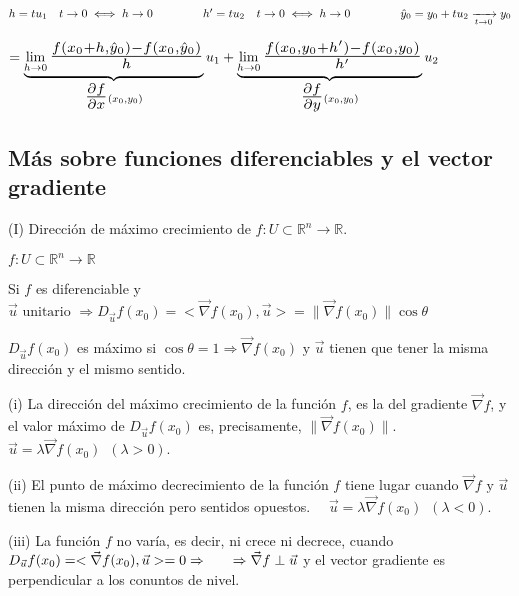 \documentclass[10pt, titlepage]{article}
\newcommand{\R}{\mathbb{R}}
\newcommand{\bfrac}[2]{\scalebox{1.4}{$\frac{#1}{#2}$}}
\newcommand{\spac}{\, \, \,}
\begin{document}
$h =tu_1 \quad t \to 0 \iff h \to 0 \hspace{1.5cm} h' = tu_2 \quad t \to 0 \iff h \to 0 \hspace{1.5cm} 
\hat{y}_0 = y_0 + tu_2 \xrightarrow[t \to 0]{} y_0$
\vspace{3mm}

$=\displaystyle \underbrace{\lim_{h \to 0} \bfrac{f (x_0 + h, \hat{y}_0) - f (x_0, \hat{y}_0)}{h}} 
_{\bfrac{\partial f}{\partial x} (x_0, y_0)} u_1 + \underbrace{\lim_{h \to 0} \bfrac{f (x_0, y_0 + h') - 
f (x_0, y_0)}{h'}}_{\bfrac{\partial f}{\partial y} (x_0, y_0)} u_2$
\vspace{7mm}

\subsection{Más sobre funciones diferenciables y el vector gradiente}
\vspace{5mm}

(I) Dirección de máximo crecimiento de $f : U \subset \R^n \to \R$.
\vspace{3mm}

$f : U \subset \R^n \to \R$
\vspace{3mm}

Si $f$ es diferenciable y $\vec{u} \text{ unitario } \Rightarrow D_{\vec{u}} f (x_0) = < \vec{\nabla} f (x_0) 
, \vec{u} > = \|\vec{\nabla} f (x_0)\| \cos \theta$
\vspace{3mm}

$D_{\vec{u}} f (x_0)$ es máximo si $\cos \theta = 1 \Rightarrow \vec{\nabla} f (x_0) \text{ y } \vec{u}$ 
tienen que tener la misma dirección y el mismo sentido.
\vspace{3mm}

(i) La dirección del máximo crecimiento de la función $f$, es la del gradiente $\vec{\nabla} f$, y el valor máximo de \indent $D_{\vec{u}} f (x_0)$ es, precisamente, $\|\vec{\nabla} f (x_0)\|$. \quad $\vec{u} = 
\lambda \vec{\nabla} f (x_0) \spac (\lambda > 0)$.
\vspace{3mm}

(ii) El punto de máximo decrecimiento de la función $f$ tiene lugar cuando $\vec{\nabla} f \text{ y } \vec{u}
$ tienen la misma \indent dirección pero sentidos opuestos. $\quad \vec{u} = \lambda \vec{\nabla} f (x_0) 
\spac (\lambda < 0)$.
\vspace{3mm}

(iii) La función $f$ no varía, es decir, ni crece ni decrece, cuando $D_{\vec{u}} f (x_0) = < \vec{\nabla} f 
(x_0), \vec{u} > = 0 \Rightarrow \\ \indent \Rightarrow \vec{\nabla} f \perp \vec{u}$ y el vector gradiente 
es perpendicular a los conuntos de nivel.
\vspace{5mm}
\end{document}
